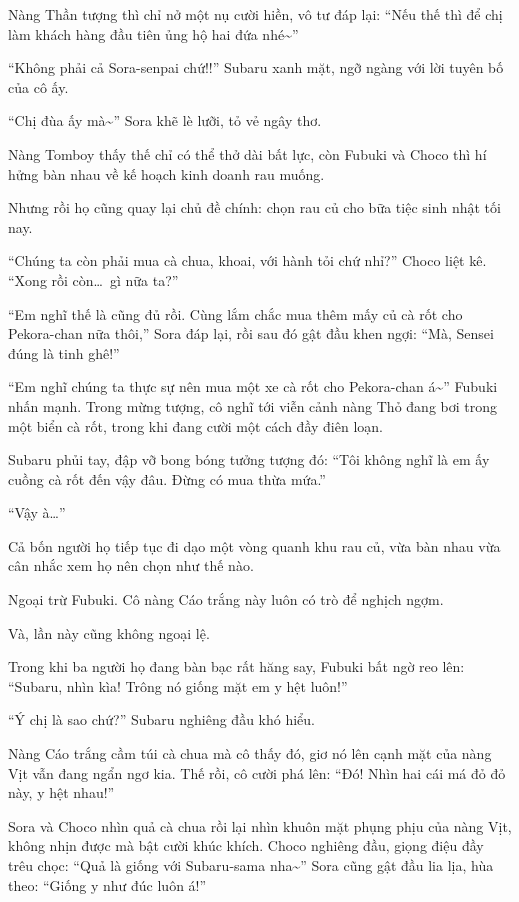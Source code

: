 \documentclass[../main.tex]{subfiles}
\begin{document}
Nàng Thần tượng thì chỉ nở một nụ cười hiền, vô tư đáp lại: ``Nếu thế thì để chị làm khách hàng đầu tiên ủng hộ hai đứa nhé\~{}''

``Không phải cả Sora-senpai chứ!!'' Subaru xanh mặt, ngỡ ngàng với lời tuyên bố của cô ấy.

``Chị đùa ấy mà\~{}'' Sora khẽ lè lưỡi, tỏ vẻ ngây thơ.

Nàng Tomboy thấy thế chỉ có thể thở dài bất lực, còn Fubuki và Choco thì hí hửng bàn nhau về kế hoạch kinh doanh rau muống.

\ct

Nhưng rồi họ cũng quay lại chủ đề chính: chọn rau củ cho bữa tiệc sinh nhật tối nay.

``Chúng ta còn phải mua cà chua, khoai, với hành tỏi chứ nhỉ?'' Choco liệt kê. ``Xong rồi còn\dots\ gì nữa ta?''

``Em nghĩ thế là cũng đủ rồi. Cùng lắm chắc mua thêm mấy củ cà rốt cho Pekora-chan nữa thôi,'' Sora đáp lại, rồi sau đó gật đầu khen ngợi: ``Mà, Sensei đúng là tinh ghê!''

``Em nghĩ chúng ta thực sự nên mua một xe cà rốt cho Pekora-chan á\~{}'' Fubuki nhấn mạnh. Trong mừng tượng, cô nghĩ tới viễn cảnh nàng Thỏ đang bơi trong một biển cà rốt, trong khi đang cười một cách đầy điên loạn.

Subaru phủi tay, đập vỡ bong bóng tưởng tượng đó: ``Tôi không nghĩ là em ấy cuồng cà rốt đến vậy đâu. Đừng có mua thừa mứa.''

``Vậy à\dots''

Cả bốn người họ tiếp tục đi dạo một vòng quanh khu rau củ, vừa bàn nhau vừa cân nhắc xem họ nên chọn như thế nào.

Ngoại trừ Fubuki. Cô nàng Cáo trắng này luôn có trò để nghịch ngợm.

Và, lần này cũng không ngoại lệ.

Trong khi ba người họ đang bàn bạc rất hăng say, Fubuki bất ngờ reo lên: ``Subaru, nhìn kìa! Trông nó giống mặt em y hệt luôn!''

``Ý chị là sao chứ?'' Subaru nghiêng đầu khó hiểu.

Nàng Cáo trắng cầm túi cà chua mà cô thấy đó, giơ nó lên cạnh mặt của nàng Vịt vẫn đang ngẩn ngơ kia. Thế rồi, cô cười phá lên: ``Đó! Nhìn hai cái má đỏ đỏ này, y hệt nhau!''

Sora và Choco nhìn quả cà chua rồi lại nhìn khuôn mặt phụng phịu của nàng Vịt, không nhịn được mà bật cười khúc khích. Choco nghiêng đầu, giọng điệu đầy trêu chọc: ``Quả là giống với Subaru-sama nha\~{}'' Sora cũng gật đầu lia lịa, hùa theo: ``Giống y như đúc luôn á!''
\end{document}
